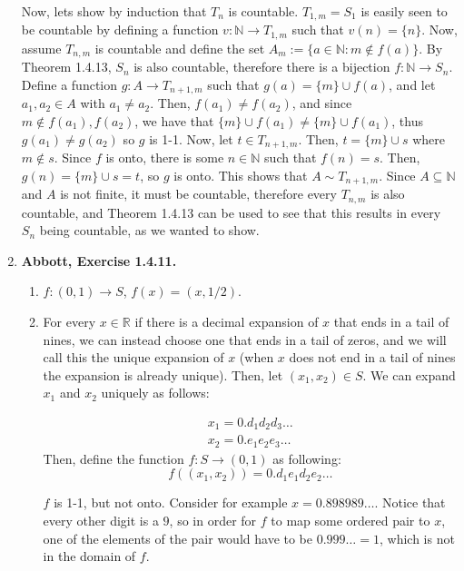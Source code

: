\documentclass{article}
\newcommand{\N}{\mathbb{N}}
\newcommand{\R}{\mathbb{R}}
\newcommand{\exc}[2][Abbott]{\item \textbf{#1, Exercise #2.}}
\begin{document}
\begin{enumerate}
	Now, lets show by induction that $T_n$ is countable. $T_{1,m} = S_1$ is easily seen to be countable by defining a function $v : \N \rightarrow T_{1,m} $ such that $v(n) = \{n\}$. Now, assume $T_{n,m}$ is countable and define the set $A_m := \{a \in \N : m \notin f(a)\}$. By Theorem 1.4.13, $S_n$ is also countable, therefore there is a bijection $f : \N \rightarrow S_n$. Define a function $g : A\rightarrow T_{n+1, m}$ such that $g(a) = \{m\} \cup f(a)$, and let $a_1, a_2 \in A$ with $a_1 \neq a_2$. Then, $f(a_1) \neq f(a_2)$, and since $m \notin f(a_1), f(a_2)$, we have that $\{m\} \cup f(a_1) \neq \{m\} \cup f(a_1)$, thus $g(a_1) \neq g(a_2)$ so $g$ is 1-1. Now, let $t \in T_{n+1, m}$. Then, $t = \{m\} \cup s$ where $m \notin s$. Since $f$ is onto, there is some $n \in \N$ such that $f(n) = s$. Then, $g(n) = \{m\} \cup s = t$, so $g$ is onto. This shows that $A \sim T_{n+1, m}$. Since $A \subseteq \N$ and $A$ is not finite, it must be countable, therefore every $T_{n, m}$ is also countable, and Theorem 1.4.13 can be used to see that this results in every $S_n$ being countable, as we wanted to show.
					    
	\exc{1.4.11}
	\begin{enumerate}
		\item $f : (0,1) \rightarrow S$, $f(x) = (x, 1/2)$.
		      		      		      	      	      	      	              
		\item For every $x \in \R$ if there is a decimal expansion of $x$ that ends in a tail of nines, we can instead choose one that ends in a tail of zeros, and we will call this the unique expansion of $x$ (when $x$ does not end in a tail of nines the expansion is already unique). Then, let $(x_1, x_2) \in S$. We can expand $x_1$ and $x_2$ uniquely as follows:
		      		      		      	      	      	      	              
		      \begin{gather}
		      	\nonumber x_1 = 0.d_1 d_2 d_3 \dots \\
		      	\nonumber x_2 = 0.e_1 e_2 e_3 \dots
		      \end{gather}
		      Then, define the function $f : S \rightarrow (0, 1)$ as following: 
		      \begin{equation*}
		      	f((x_1, x_2)) = 0.d_1e_1d_2e_2 \dots
		      \end{equation*}
		      		      		      	      	      	      	             
		      $f$ is 1-1, but not onto. Consider for example $x = 0.898989\dots$. Notice that every other digit is a $9$, so in order for $f$ to map some ordered pair to $x$, one of the elements of the pair would have to be $0.999\dots = 1$, which is not in the domain of $f$.
	\end{enumerate}
				      	          

\end{enumerate}
\end{document}
